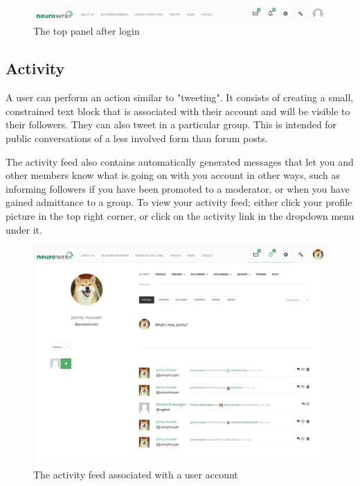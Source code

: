 \documentclass[10pt]{article}
\begin{document}
\begin{figure}[h]
    \centering
    \includegraphics[scale=0.3]{images/topbarlogged.jpg}
    \caption{The top panel after login}
    \label{topbarlogged}
\end{figure}

\subsection{Activity} \label{Activity}

\begin{flushleft}
A user can perform an action similar to "tweeting".  It consists of creating a small, constrained text block that is associated with their account and will be visible to their followers.  They can also tweet in a particular group.  This is intended for public conversations of a less involved form than forum posts.  
\end{flushleft}

\begin{flushleft}
The activity feed also contains automatically generated messages that let you and other members know what is going on with you account in other ways, such as informing followers if you have been promoted to a moderator, or when you have gained admittance to a group.  To view your activity feed; either click your profile picture in the top right corner, or click on the activity link in the dropdown menu under it. 
\end{flushleft}

\begin{figure}[H]
    \centering
    \includegraphics[scale=0.3]{images/whatsnew.jpg}
    \caption{The activity feed associated with a user account}
    \label{whatsnew}
\end{figure}
\end{document}
